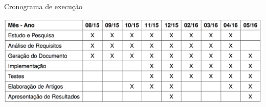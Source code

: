 \renewcommand{\arraystretch}{1.5}



\begin{table}[h!]
	\centering
	\caption{Cronograma de execução}
	\includegraphics[width=1\textwidth]{Cap1/imagens/tabela}
	\label{cronograma}
\end{table}


